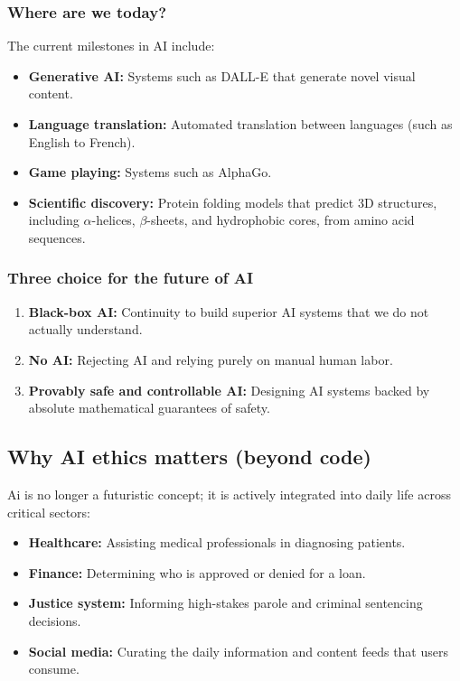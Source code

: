 \documentclass[11pt]{article}
\begin{document}
\subsubsection{Where are we today?}
The current milestones in AI include:
\begin{itemize}
    \item \textbf{Generative AI:} Systems such as DALL-E that generate novel visual content.
    \item \textbf{Language translation:} Automated translation between languages (such as English to French).
    \item \textbf{Game playing:} Systems such as AlphaGo.
    \item \textbf{Scientific discovery:} Protein folding models that predict 3D structures, including $\alpha$-helices, $\beta$-sheets, and hydrophobic cores, from amino acid sequences.
\end{itemize}
\subsubsection{Three choice for the future of AI}
\begin{enumerate}
    \item \textbf{Black-box AI:} Continuity to build superior AI systems that we do not actually understand.
    \item \textbf{No AI:} Rejecting AI and relying purely on manual human labor.
    \item \textbf{Provably safe and controllable AI:} Designing AI systems backed by absolute mathematical guarantees of safety.
\end{enumerate}

\subsection{Why AI ethics matters (beyond code)}
Ai is no longer a futuristic concept; it is actively integrated into daily life across critical sectors:
\begin{itemize}
    \item \textbf{Healthcare:} Assisting medical professionals in diagnosing patients.
    \item \textbf{Finance:} Determining who is approved or denied for a loan.
    \item \textbf{Justice system:} Informing high-stakes parole and criminal sentencing decisions.
    \item \textbf{Social media:} Curating the daily information and content feeds that users consume.
\end{itemize}
\end{document}
